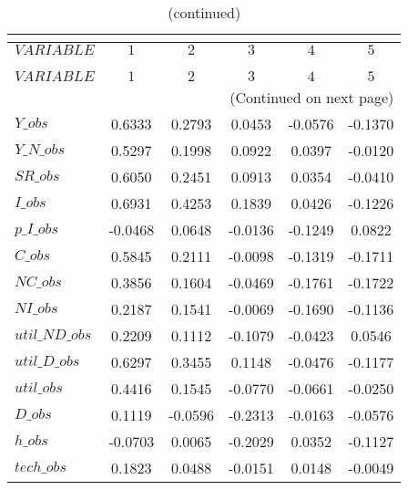  
\begin{center}
\begin{longtable}{lccccc} 
\caption{AUTOCORRELATION OF SIMULATED VARIABLES}\\
 \label{Table:sim_autocorr_matrix}\\
\toprule 
$VARIABLE       $	 & 	 $          1$	 & 	 $          2$	 & 	 $          3$	 & 	 $          4$	 & 	 $          5$\\
\midrule \endfirsthead 
\caption{(continued)}\\
 \toprule \\ 
$VARIABLE       $	 & 	 $          1$	 & 	 $          2$	 & 	 $          3$	 & 	 $          4$	 & 	 $          5$\\
\midrule \endhead 
\midrule \multicolumn{6}{r}{(Continued on next page)} \\ \bottomrule \endfoot 
\bottomrule \endlastfoot 
$Y\_obs         $	 & 	     0.6333	 & 	     0.2793	 & 	     0.0453	 & 	    -0.0576	 & 	    -0.1370 \\ 
$Y\_N\_obs      $	 & 	     0.5297	 & 	     0.1998	 & 	     0.0922	 & 	     0.0397	 & 	    -0.0120 \\ 
$SR\_obs        $	 & 	     0.6050	 & 	     0.2451	 & 	     0.0913	 & 	     0.0354	 & 	    -0.0410 \\ 
$I\_obs         $	 & 	     0.6931	 & 	     0.4253	 & 	     0.1839	 & 	     0.0426	 & 	    -0.1226 \\ 
$p\_I\_obs      $	 & 	    -0.0468	 & 	     0.0648	 & 	    -0.0136	 & 	    -0.1249	 & 	     0.0822 \\ 
$C\_obs         $	 & 	     0.5845	 & 	     0.2111	 & 	    -0.0098	 & 	    -0.1319	 & 	    -0.1711 \\ 
$NC\_obs        $	 & 	     0.3856	 & 	     0.1604	 & 	    -0.0469	 & 	    -0.1761	 & 	    -0.1722 \\ 
$NI\_obs        $	 & 	     0.2187	 & 	     0.1541	 & 	    -0.0069	 & 	    -0.1690	 & 	    -0.1136 \\ 
$util\_ND\_obs  $	 & 	     0.2209	 & 	     0.1112	 & 	    -0.1079	 & 	    -0.0423	 & 	     0.0546 \\ 
$util\_D\_obs   $	 & 	     0.6297	 & 	     0.3455	 & 	     0.1148	 & 	    -0.0476	 & 	    -0.1177 \\ 
$util\_obs      $	 & 	     0.4416	 & 	     0.1545	 & 	    -0.0770	 & 	    -0.0661	 & 	    -0.0250 \\ 
$D\_obs         $	 & 	     0.1119	 & 	    -0.0596	 & 	    -0.2313	 & 	    -0.0163	 & 	    -0.0576 \\ 
$h\_obs         $	 & 	    -0.0703	 & 	     0.0065	 & 	    -0.2029	 & 	     0.0352	 & 	    -0.1127 \\ 
$tech\_obs      $	 & 	     0.1823	 & 	     0.0488	 & 	    -0.0151	 & 	     0.0148	 & 	    -0.0049 \\ 
\end{longtable}
 \end{center}

